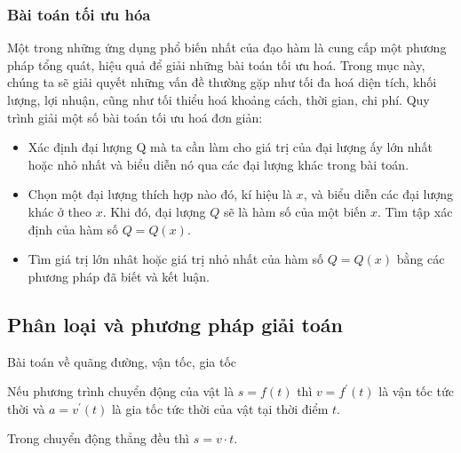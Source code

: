 \subsubsection{Bài toán tối ưu hóa}
Một trong những ứng dụng phổ biến nhất của đạo hàm là cung cấp một phương pháp tổng quát, hiệu quả để giải những bài toán tối ưu hoá. Trong mục này, chúng ta sẽ giải quyết những vấn đề thường gặp như tối đa hoá diện tích, khối lượng, lợi nhuận, cũng như tối thiểu hoá khoảng cách, thời gian, chi phí. Quy trình giải một số bài toán tối ưu hoá  đơn giản:
\begin{gachsoc}
	\begin{itemize}
		\item[\iconCH] Xác định đại lượng Q mà ta cần làm cho giá trị của đại lượng ấy lớn nhất hoặc nhỏ nhất và biểu diễn nó qua các đại lượng khác trong bài toán.
		
		\item[\iconCH]  Chọn một đại lượng thích hợp nào đó, kí hiệu là $x$, và biểu diễn các đại lượng khác ở  theo $x$. Khi đó, đại lượng $Q$ sẽ là hàm số của một biến $x$. Tìm tập xác định của hàm số $Q=Q(x)$.
		
		\item[\iconCH]  Tìm giá trị lớn nhât hoặc giá trị nhỏ nhất của hàm số $Q=Q(x)$ bằng các phương pháp đã biết và kết luận.
	\end{itemize}
\end{gachsoc}
\subsection{Phân loại và phương pháp giải toán}
\begin{dang}{Bài toán về quãng đường, vận tốc, gia tốc}
	\begin{listEX}[1]
		\item [\ding{172}] Nếu phương trình chuyển động của vật là $s=f(t)$ thì $v=f^{\prime}(t)$ là vận tốc tức thời và $a=v^{\prime}(t)$ là gia tốc tức thời của vật tại thời điểm $t$.
		\item [\ding{173}] Trong chuyển động thẳng đều thì $s=v \cdot t$.
	\end{listEX}
\end{dang}


